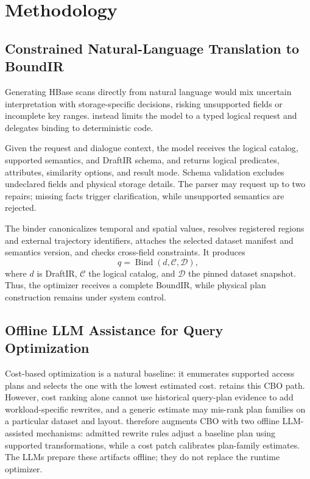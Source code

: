 \section{Methodology}\label{sec:methodology}

\subsection{Constrained Natural-Language Translation to BoundIR}\label{sec:method-ir}

Generating HBase scans directly from natural language would mix uncertain interpretation with storage-specific decisions, risking unsupported fields or incomplete key ranges. \KART{} instead limits the model to a typed logical request and delegates binding to deterministic code.

Given the request and dialogue context, the model receives the logical catalog, supported semantics, and DraftIR schema, and returns logical predicates, attributes, similarity options, and result mode. Schema validation excludes undeclared fields and physical storage details. The parser may request up to two repairs; missing facts trigger clarification, while unsupported semantics are rejected.

The binder canonicalizes temporal and spatial values, resolves registered regions and external trajectory identifiers, attaches the selected dataset manifest and semantics version, and checks cross-field constraints. It produces
\begin{equation}\label{eq:method-bind}
q=\operatorname{Bind}(d,\mathcal{C},\mathcal{D}),
\end{equation}
where $d$ is DraftIR, $\mathcal{C}$ the logical catalog, and $\mathcal{D}$ the pinned dataset snapshot. Thus, the optimizer receives a complete BoundIR, while physical plan construction remains under system control.

\subsection{Offline LLM Assistance for Query Optimization}\label{sec:method-offline-llm}

Cost-based optimization is a natural baseline: it enumerates supported access plans and selects the one with the lowest estimated cost. \KART{} retains this CBO path. However, cost ranking alone cannot use historical query-plan evidence to add workload-specific rewrites, and a generic estimate may mis-rank plan families on a particular dataset and layout. \KART{} therefore augments CBO with two offline LLM-assisted mechanisms: admitted rewrite rules adjust a baseline plan using supported transformations, while a cost patch calibrates plan-family estimates. The LLMs prepare these artifacts offline; they do not replace the runtime optimizer.

